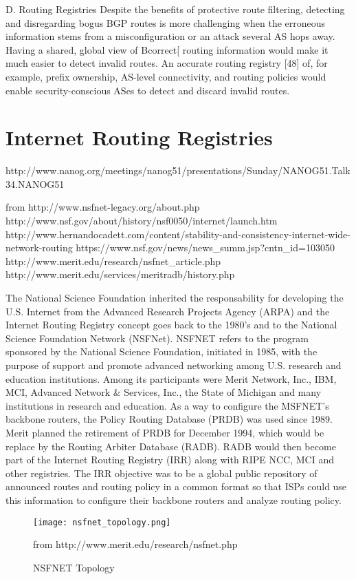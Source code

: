 \documentclass[11pt,a4paper]{scrreprt}
\begin{document}
D. Routing Registries
Despite the benefits of protective route filtering,
detecting and disregarding bogus BGP routes is more
challenging when the erroneous information stems from a
misconfiguration or an attack several AS hops away.
Having a shared, global view of Bcorrect[ routing
information would make it much easier to detect invalid
routes. An accurate routing registry [48] of, for example,
prefix ownership, AS-level connectivity, and routing
policies would enable security-conscious ASes to detect
and discard invalid routes. 


\section{Internet Routing Registries}
http://www.nanog.org/meetings/nanog51/presentations/Sunday/NANOG51.Talk34.NANOG51%

from http://www.nsfnet-legacy.org/about.php
http://www.nsf.gov/about/history/nsf0050/internet/launch.htm
http://www.hernandocadett.com/content/stability-and-consistency-internet-wide-network-routing
https://www.nsf.gov/news/news\_summ.jsp?cntn\_id=103050
http://www.merit.edu/research/nsfnet\_article.php
http://www.merit.edu/services/meritradb/history.php

The National Science Foundation inherited the responsability for developing the U.S. Internet from the Advanced Research Projects Agency (ARPA) and the Internet Routing Registry concept goes back to the 1980's and to the National Science Foundation Network (NSFNet).  NSFNET refers to the program sponsored by the National Science Foundation, initiated in 1985, with the purpose of support and promote advanced networking among U.S. research and education institutions. Among its participants were Merit Network, Inc., IBM, MCI, Advanced Network \& Services, Inc., the State of Michigan and many institutions in research and education. As a way to configure the MSFNET's backbone routers, the Policy Routing Database (PRDB) was used since 1989. Merit planned the retirement of PRDB for December 1994, which would be replace by the Routing Arbiter Database (RADB). RADB would then become part of the Internet Routing Registry (IRR) along with RIPE NCC, MCI and other registries. The IRR objective was to be a global public repository of announced routes and routing policy in a common format so that ISPs could use this information to configure their backbone routers and analyze routing policy.

\begin{figure}[h!]
\centering
\texttt{[image: nsfnet\_topology.png]}
\caption{NSFNET Topology}
from http://www.merit.edu/research/nsfnet.php
\label{fig:nfsnet_image}
\end{figure}
\end{document}
